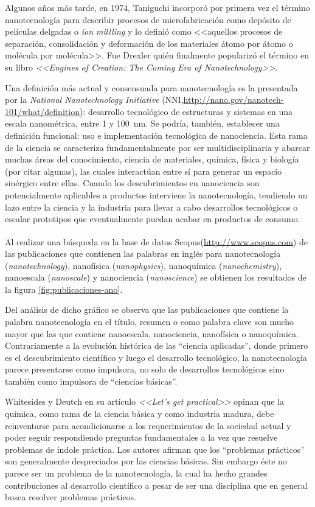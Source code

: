 	 Algunos años más tarde, en 1974, Taniguchi incorporó por primera vez el término nanotecnología para describir procesos de microfabricación como depósito de películas delgadas o \textit{ion millling} y lo definió como <<aquellos procesos de separación, consolidación y deformación de los materiales átomo por átomo o molécula por molécula>>. \cite{taniguchi1974} Fue Drexler quién finalmente popularizó el término en su libro \textit{<<Engines of Creation: The Coming Era of Nanotechnology>>}\cite{drexler1987}. 

	 Una definición más actual y consensuada para nanotecnología es la presentada por la \textit{National Nanotechnology Initiative} (NNI,\url{http://nano.gov/nanotech-101/what/definition}): desarrollo tecnológico de estructuras y sistemas en una escala nanométrica, entre 1 y \SI{100}{\nm}. Se podría, también, establecer una definición funcional: uso e implementación tecnológica de nanociencia. Esta rama de la ciencia se caracteriza fundamentalmente por ser multidisciplinaria y abarcar muchas áreas del conocimiento, ciencia de materiales, química, física y biología (por citar algunas), las cuales interactúan entre sí para generar un espacio sinérgico entre ellas. Cuando los descubrimientos en nanociencia son potencialmente aplicables a productos interviene la nanotecnología, tendiendo un lazo entre la ciencia y la industria para llevar a cabo desarrollos tecnológicos o escalar prototipos que eventualmente puedan acabar en productos de consumo.
	
		Al realizar una búsqueda en la base de datos Scopus\textsuperscript\textregistered (\url{http://www.scopus.com}) de las publicaciones que contienen las palabras en inglés para nanotecnología (\textit{nanotechnology}), nanofísica (\textit{nanophysics}), nanoquímica (\textit{nanochemistry}), nanoescala (\textit{nanoscale}) y nanociencia (\textit{nanoscience}) se obtienen los resultados de la figura \ref{fig:publicaciones-ano}. 

	 Del análisis de dicho gráfico se observa que las publicaciones que contiene la palabra nanotecnología en el título, resumen o como palabra clave son mucho mayor que las que contiene nanoescala, nanociencia, nanofísica o nanoquímica. Contrariamente a la evolución histórica de las ``ciencia aplicadas'', donde primero es el descubrimiento científico y luego el desarrollo tecnológico, la nanotecnología parece presentarse como impulsora, no solo de desarrollos tecnológicos sino también como impulsora de ``ciencias básicas''.

	 Whitesides y Deutch en su artículo \textit{<<Let's get practical>>}\cite{Burdass2010} opinan que la química, como rama de la ciencia básica y como industria madura, debe reinventarse para acondicionarse a los requerimientos de la sociedad actual y poder seguir respondiendo preguntas fundamentales a la vez que resuelve problemas de índole práctica. Los autores afirman que los ``problemas prácticos'' son generalmente despreciados por las ciencias básicas.  Sin embargo éste no parece ser un problema de la nanotecnología, la cual ha hecho grandes contribuciones al desarrollo científico a pesar de ser una disciplina que en general busca resolver problemas prácticos.
			

